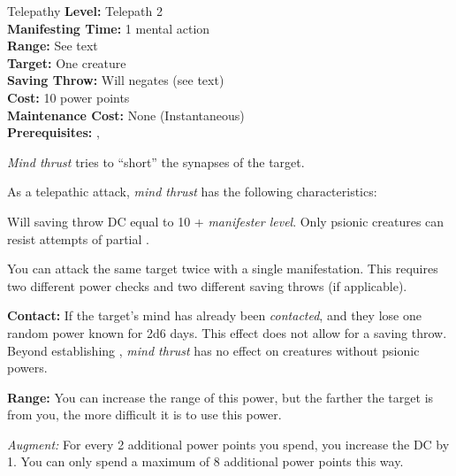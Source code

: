 {Telepathy}
{
	\textbf{Level:}
	Telepath 2\\
	\textbf{Manifesting Time:}
	1 mental action\\
	\textbf{Range:}
	See text\\
	\textbf{Target:}
	One creature\\
	\textbf{Saving Throw:}
	Will negates (see text)\\
	\textbf{Cost:}
	10 power points\\
	\textbf{Maintenance Cost:}
	None (Instantaneous)\\
	\textbf{Prerequisites:}
	, \\
}
{
	\emph{Mind thrust} tries to ``short'' the synapses of the target.

	As a telepathic attack, \emph{mind thrust} has the following characteristics:
	\begin{itemize*}
		\item Will saving throw DC equal to 10 + \textit{manifester level}. Only psionic creatures can resist attempts of partial .
		\item You can attack the same target twice with a single manifestation. This requires two different power checks and two different saving throws (if applicable).
	\end{itemize*}

	\textbf{Contact:} If the target's mind has already been \emph{contacted}, and they lose one random power known for 2d6 days. This effect does not allow for a saving throw. Beyond establishing , \emph{mind thrust} has no effect on creatures without psionic powers.
	
	\textbf{Range:} You can increase the range of this power, but the farther the target is from you, the more difficult it is to use this power.


	\textit{Augment:} For every 2 additional power points you spend, you increase the DC by 1. You can only spend a maximum of 8 additional power points this way.
}
